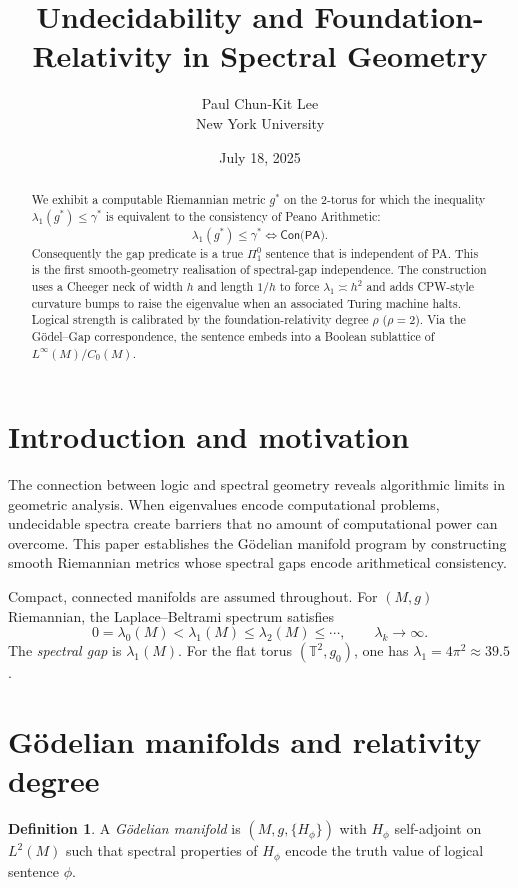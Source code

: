 \documentclass[11pt]{article}
\title{Undecidability and Foundation-Relativity in Spectral Geometry}
\author{Paul Chun-Kit Lee \\ New York University}
\date{July 18, 2025}
\theoremstyle{definition}\newtheorem{definition}[theorem]{Definition}
\theoremstyle{remark}\newtheorem{remark}[theorem]{Remark}
\begin{document}
\maketitle

\begin{abstract}
We exhibit a computable Riemannian metric $g^{\ast}$ on the 2-torus for
which the inequality $\lambda_{1}(g^{\ast})\le\gamma^{\ast}$ is
equivalent to the consistency of Peano Arithmetic:
\[
    \lambda_{1}(g^{\ast})\le\gamma^{\ast} \Longleftrightarrow
    \textsf{Con(PA)} .
\]
Consequently the gap predicate is a true $\Pi^{0}_{1}$ sentence that is
independent of PA. This is the first smooth-geometry realisation of
spectral-gap independence. The construction uses a Cheeger neck of
width $h$ and length $1/h$ to force $\lambda_{1}\asymp h^{2}$ and
adds CPW-style curvature bumps to raise the eigenvalue when an
associated Turing machine halts. Logical strength is calibrated by the
foundation-relativity degree $\rho$ ($\rho=2$). Via the
Gödel–Gap correspondence, the sentence embeds into a Boolean sublattice
of $L^{\infty}(M)/C_{0}(M)$.
\end{abstract}

\tableofcontents

\section{Introduction and motivation}
\label{sec:intro}

The connection between logic and spectral geometry reveals algorithmic limits in geometric analysis. When eigenvalues encode computational problems, undecidable spectra create barriers that no amount of computational power can overcome. This paper establishes the Gödelian manifold program by constructing smooth Riemannian metrics whose spectral gaps encode arithmetical consistency.

Compact, connected manifolds are assumed throughout. For $(M,g)$ Riemannian, the Laplace–Beltrami spectrum satisfies
\[
0=\lambda_0(M)<\lambda_1(M)\le\lambda_2(M)\le\cdots,\qquad
\lambda_k\to\infty.
\]
The \emph{spectral gap} is $\lambda_1(M)$. For the flat torus $(\mathbb{T}^2, g_0)$, one has $\lambda_1 = 4\pi^2 \approx 39.5$.

\section{Gödelian manifolds and relativity degree}

\begin{definition}
A \emph{Gödelian manifold} is $(M,g,\{H_\phi\})$ with $H_\phi$ self-adjoint on $L^2(M)$ such that spectral properties of $H_\phi$ encode the truth value of logical sentence $\phi$.
\end{definition}
\end{document}
